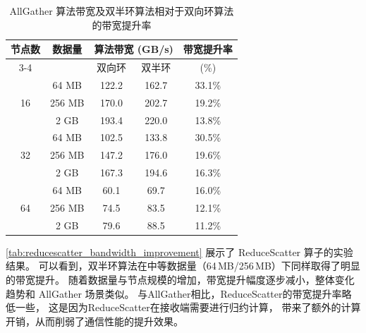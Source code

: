 \begin{table}[!htbp]
\centering
\caption{AllGather 算法带宽及双半环算法相对于双向环算法的带宽提升率}
\label{tab:allgather_bandwidth_improvement}
\begin{tabular}{c c c c c}
\toprule
\multirow{2}{*}{节点数} & \multirow{2}{*}{数据量} &
\multicolumn{2}{c}{算法带宽 (GB/s)} &
带宽提升率 \\
\cmidrule(lr){3-4}
 & & 双向环 & 双半环 & (\%) \\
\midrule
\multirow{3}{*}{16}
 & 64 MB  & 122.2 & 162.7 & 33.1\% \\
 & 256 MB & 170.0 & 202.7 & 19.2\% \\
 & 2 GB   & 193.4 & 220.0 & 13.8\% \\
\midrule
\multirow{3}{*}{32}
 & 64 MB  & 102.5 & 133.8 & 30.5\% \\
 & 256 MB & 147.2 & 176.0 & 19.6\% \\
 & 2 GB   & 167.3 & 194.6 & 16.3\% \\
\midrule
\multirow{3}{*}{64}
 & 64 MB  & 60.1  & 69.7  & 16.0\% \\
 & 256 MB & 74.5  & 83.5  & 12.1\% \\
 & 2 GB   & 79.6  & 88.5  & 11.2\% \\
\bottomrule
\end{tabular}
\end{table}



\autoref{tab:reducescatter_bandwidth_improvement} 展示了 ReduceScatter 算子的实验结果。
可以看到，双半环算法在中等数据量（64\,MB/256\,MB）下同样取得了明显的带宽提升。
随着数据量与节点规模的增加，带宽提升幅度逐步减小，整体变化趋势和 AllGather 场景类似。
与AllGather相比，ReduceScatter的带宽提升率略低一些，
这是因为ReduceScatter在接收端需要进行归约计算，
带来了额外的计算开销，从而削弱了通信性能的提升效果。



